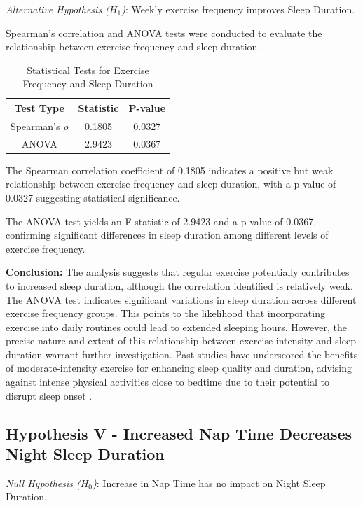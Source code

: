 \documentclass[conference]{IEEEtran}
\begin{document}
\textit{Alternative Hypothesis (\(H_1\))}: Weekly exercise frequency improves Sleep Duration.

Spearman's correlation and ANOVA tests were conducted to evaluate the relationship between exercise frequency and sleep duration.

\begin{table}[ht]
    \centering
    \caption{Statistical Tests for Exercise Frequency and Sleep Duration}
    \label{tab:hypothesis4b}
    \begin{tabular}{|c|c|c|}
        \hline
        \textbf{Test Type}  & \textbf{Statistic} & \textbf{P-value} \\
        \hline
        Spearman's \(\rho\) & 0.1805             & 0.0327           \\
        \hline
        ANOVA               & 2.9423             & 0.0367           \\
        \hline
    \end{tabular}
\end{table}

The Spearman correlation coefficient of 0.1805 indicates a positive but weak relationship between exercise frequency and sleep duration, with a p-value of 0.0327 suggesting statistical significance.

The ANOVA test yields an F-statistic of 2.9423 and a p-value of 0.0367, confirming significant differences in sleep duration among different levels of exercise frequency.

\textbf{Conclusion:}
The analysis suggests that regular exercise potentially contributes to increased sleep duration, although the correlation identified is relatively weak. The ANOVA test indicates significant variations in sleep duration across different exercise frequency groups. This points to the likelihood that incorporating exercise into daily routines could lead to extended sleeping hours. However, the precise nature and extent of this relationship between exercise intensity and sleep duration warrant further investigation. Past studies have underscored the benefits of moderate-intensity exercise for enhancing sleep quality and duration, advising against intense physical activities close to bedtime due to their potential to disrupt sleep onset \cite{sleepfoundation, aasmsleep, mayoclinicsleep}.

\subsection*{Hypothesis V - Increased Nap Time Decreases Night Sleep Duration}
\textit{Null Hypothesis (\(H_0\))}: Increase in Nap Time has no impact on Night Sleep Duration.
\end{document}
